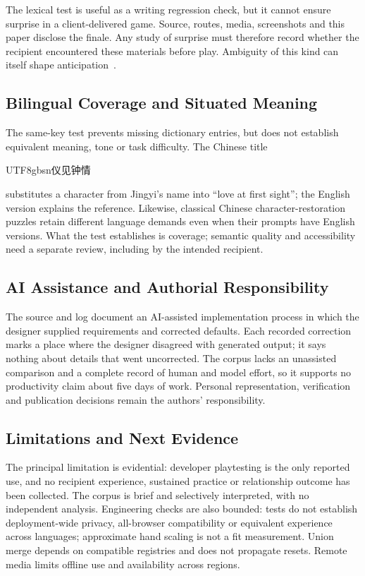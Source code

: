 \documentclass[sigconf,nonacm]{acmart}
\newcommand{\zh}[1]{\begingroup\normalfont\begin{CJK*}{UTF8}{gbsn}#1\end{CJK*}\endgroup}
\begin{document}
The lexical test is useful as a writing regression check, but it cannot ensure surprise in a
client-delivered game. Source, routes, media, screenshots and this paper disclose the finale.
Any study of surprise must therefore record whether the recipient encountered these materials
before play. Ambiguity of this kind can itself shape anticipation~\cite{gaver2003ambiguity}.

\subsection{Bilingual Coverage and Situated Meaning}
The same-key test prevents missing dictionary entries, but does not establish equivalent meaning,
tone or task difficulty. The Chinese title \zh{仪见钟情} substitutes a character from Jingyi's name
into ``love at first sight''; the English version explains the reference. Likewise, classical
Chinese character-restoration puzzles retain different language demands even when their prompts
have English versions. What the test establishes is coverage; semantic quality and accessibility
need a separate review, including by the intended recipient.

\subsection{AI Assistance and Authorial Responsibility}
The source and log document an AI-assisted implementation process in which the designer supplied
requirements and corrected defaults. Each recorded correction marks a place where the designer
disagreed with generated output; it says nothing about details that went uncorrected. The corpus
lacks an unassisted comparison and a complete record of human and model effort, so it supports no
productivity claim about five days of work. Personal representation, verification and publication
decisions remain the authors' responsibility.

\subsection{Limitations and Next Evidence}
The principal limitation is evidential: developer playtesting is the only reported use, and no
recipient experience, sustained practice or relationship outcome has been collected. The corpus
is brief and selectively interpreted, with no independent analysis. Engineering checks are also
bounded: tests do not establish deployment-wide privacy, all-browser compatibility or equivalent
experience across languages; approximate hand scaling is not a fit measurement. Union merge
depends on compatible registries and does not propagate resets. Remote media limits offline use
and availability across regions.
\end{document}
